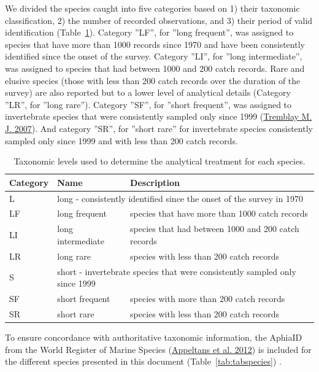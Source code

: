 \documentclass[12pt]{article}\usepackage[]{graphicx}\usepackage[]{color}
\begin{document}
We divided the species caught into five categories based on 1) their taxonomic classification, 2) the number of recorded observations, and 3) their period of valid identification (Table~\ref{tab:taxocat}). Category ''LF'', for ''long frequent'', was assigned to species that have more than 1000 records since 1970 and have been consistently identified since the onset of the survey. Category ''LI'', for ''long intermediate'', was assigned to species that had between 1000 and 200 catch records. Rare and elusive species (those with less than 200 catch records over the duration of the survey) are also reported but to a lower level of analytical details (Category ''LR'', for ''long rare''). Category ''SF'', for ''short frequent'', was assigned to invertebrate species that were consistently sampled only since 1999 (\protect\hyperlink{ref-Tremblayetal:2007}{Tremblay M. J. 2007}). And category ''SR'', for ''short rare'' for invertebrate species consistently sampled only since 1999 and with less than 200 catch records.
\begin{table}
\caption{Taxonomic levels used to determine the analytical treatment for each species.}
\begin{tabular}{p{}p{}p{}}
\toprule
\bfseries{Category} & \bfseries{Name} & \bfseries{Description} \\
\midrule
L & \multicolumn{2}{l}{long - consistently identified since the onset of the survey in 1970}\\
\midrule
LF & long frequent & species that have more than 1000 catch records \\

LI & long intermediate & species that had between 1000 and 200 catch records\\

LR & long rare & species with less than 200 catch records\\
\midrule
S & \multicolumn{2}{l}{short - invertebrate species that were consistently sampled only since 1999}\\
\midrule
SF & short frequent & species with more than 200 catch records \\

SR & short rare & species with less than 200 catch records\\
\bottomrule
\end{tabular}
\label{tab:taxocat}
\end{table}
To ensure concordance with authoritative taxonomic information, the AphiaID from the World Register of Marine Species (\protect\hyperlink{ref-WoRMS}{Appeltans et al. 2012}) is included for the different species presented in this document (Table~\ref{tab:tabspecies}) .
\end{document}
